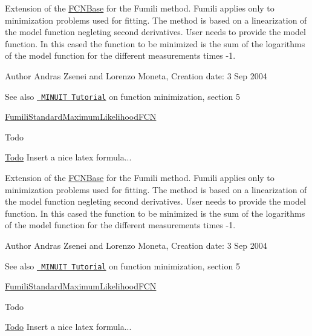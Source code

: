 Extension of the \mbox{\hyperlink{classROOT_1_1Minuit2_1_1FCNBase}{F\+C\+N\+Base}} for the Fumili method. Fumili applies only to minimization problems used for fitting. The method is based on a linearization of the model function negleting second derivatives. User needs to provide the model function. In this cased the function to be minimized is the sum of the logarithms of the model function for the different measurements times -\/1.

\begin{DoxyAuthor}{Author}
Andras Zsenei and Lorenzo Moneta, Creation date\+: 3 Sep 2004
\end{DoxyAuthor}
\begin{DoxySeeAlso}{See also}
\href{http://www.cern.ch/winkler/minuit/tutorial/mntutorial.pdf}{\texttt{ M\+I\+N\+U\+IT Tutorial}} on function minimization, section 5

\mbox{\hyperlink{classROOT_1_1Minuit2_1_1FumiliStandardMaximumLikelihoodFCN}{Fumili\+Standard\+Maximum\+Likelihood\+F\+CN}}
\end{DoxySeeAlso}
\begin{DoxyRefDesc}{Todo}
\item[\mbox{\hyperlink{todo__todo000020}{Todo}}]Insert a nice latex formula...\end{DoxyRefDesc}


Extension of the \mbox{\hyperlink{classROOT_1_1Minuit2_1_1FCNBase}{F\+C\+N\+Base}} for the Fumili method. Fumili applies only to minimization problems used for fitting. The method is based on a linearization of the model function negleting second derivatives. User needs to provide the model function. In this cased the function to be minimized is the sum of the logarithms of the model function for the different measurements times -\/1.

\begin{DoxyAuthor}{Author}
Andras Zsenei and Lorenzo Moneta, Creation date\+: 3 Sep 2004
\end{DoxyAuthor}
\begin{DoxySeeAlso}{See also}
\href{http://www.cern.ch/winkler/minuit/tutorial/mntutorial.pdf}{\texttt{ M\+I\+N\+U\+IT Tutorial}} on function minimization, section 5

\mbox{\hyperlink{classROOT_1_1Minuit2_1_1FumiliStandardMaximumLikelihoodFCN}{Fumili\+Standard\+Maximum\+Likelihood\+F\+CN}}
\end{DoxySeeAlso}
\begin{DoxyRefDesc}{Todo}
\item[\mbox{\hyperlink{todo__todo000032}{Todo}}]Insert a nice latex formula...\end{DoxyRefDesc}


